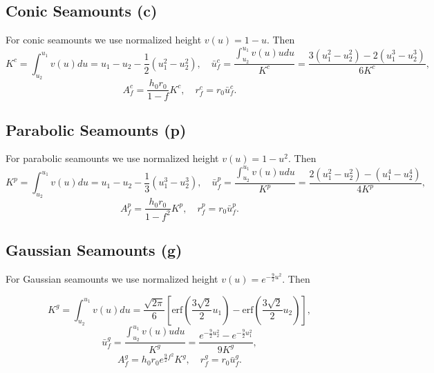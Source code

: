 \documentclass[12pt,letterpaper,margin=0.5in]{report}
\begin{document}
\subsection{Conic Seamounts (c)}

For conic seamounts we use normalized height $v(u) = 1 - u$. Then
\begin{equation}
K^c = \int_{u_2}^{u_1} v(u) du = u_1 - u_2 - \frac{1}{2}\left ( u_1^2 - u_2^2 \right ), \quad \bar{u}_f^c = \frac{\int_{u_2}^{u_1} v(u) u du}{K^c} = \frac{3(u_1^2 - u_2^2) - 2 (u_1^3 - u_2^3)}{6K^c},
\end{equation}
\begin{equation}
A_f^c = \frac{h_0 r_0}{1-f}K^c, \quad r_f^c = r_0\bar{u}_f^c.
\end{equation}

\subsection{Parabolic Seamounts (p)}

For parabolic seamounts we use normalized height $v(u) = 1 - u^2$. Then
\begin{equation}
K^p = \int_{u_2}^{u_1} v(u) du = u_1 - u_2 - \frac{1}{3}\left ( u_1^3 - u_2^3 \right ), \quad \bar{u}_f^p = \frac{\int_{u_2}^{u_1} v(u) u du}{K^p} = \frac{2(u_1^2 - u_2^2) - (u_1^4 - u_2^4)}{4K^p},
\end{equation}
\begin{equation}
A_f^p = \frac{h_0 r_0}{1-f^2}K^p, \quad r_f^p = r_0\bar{u}_f^p.
\end{equation}

\subsection{Gaussian Seamounts (g)}

For Gaussian seamounts we use normalized height $v(u) = e^{-\frac{9}{2}u^2}$. Then

\begin{equation}
K^g = \int_{u_2}^{u_1} v(u) du = \frac{\sqrt{2\pi}}{6} \left [ \mbox{erf} \left (\frac{3\sqrt{2}}{2}u_1\right ) - \mbox{erf} \left (\frac{3\sqrt{2}}{2}u_2\right ) \right ],
\end{equation}
\begin{equation}
\bar{u}_f^g = \frac{\int_{u_2}^{u_1} v(u) u du}{K^g} = \frac{e^{-\frac{9}{2}u_2^2} - e^{-\frac{9}{2}u_1^2}}{9K^g},
\end{equation}
\begin{equation}
A_f^g = h_0 r_0 e^{\frac{9}{2}f^2} K^g, \quad r_f^g = r_0\bar{u}_f^g.
\end{equation}
\end{document}
